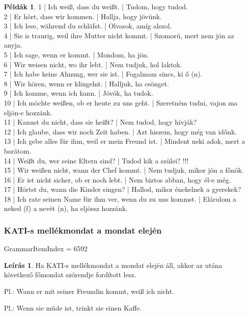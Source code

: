\documentclass{article}
\theoremstyle{definition}
\newtheorem*{exmp}{Példák}
\newtheorem*{desc}{Leírás}
\begin{document}
\begin{exmp}
1 | Ich weiß, dass du weißt. | Tudom, hogy tudod.\\
2 | Er hört, dass wir kommen. | Hallja, hogy jövünk.\\
3 | Ich lese, während du schläfst. | Olvasok, amíg alszol.\\
4 | Sie is traurig, weil ihre Mutter nicht kommt. | Szomorú, mert nem jön az anyja.\\
5 | Ich sage, wenn er kommt. | Mondom, ha jön.\\
6 | Wir weisen nicht, wo ihr lebt. | Nem tudjuk, hol laktok.\\
7 | Ich habe keine Ahnung, wer sie ist. | Fogalmam sincs, ki ő (n).\\
8 | Wir hören, wenn er klingelnt. | Halljuk, ha csönget.\\
9 | Ich komme, wenn ich kann. | Jövök, ha tudok.\\
10 | Ich möchte weißen, ob er heute zu uns geht. | Szeretném tudni, vajon ma eljön-e hozzánk.\\
11 | Kannst du nicht, dass sie heißt? | Nem tudod, hogy hívják?\\
12 | Ich glaube, dass wir noch Zeit haben. | Azt hiszem, hogy még van időnk.\\
13 | Ich gebe alles für ihm, weil er mein Freund ist. | Mindent neki adok, mert a barátom.\\
14 | Weißt du, wer seine Eltern sind? | Tudod kik a szülei? !!!\\
15 | Wir weißen nicht, wann der Chef kommt. | Nem tudjuk, mikor jön a főnök.\\
16 | Er ist nicht sicher, ob er noch lebt. | Nem biztos abban, hogy él-e még.\\
17 | Hörtst du, wann die Kinder singen? | Hallod, mikor énekelnek a gyerekek?\\
18 | Ich rate seinen Name für ihm ver, wenn du zu uns kommst. | Elárulom a neked (f) a nevét (n), ha eljössz hozzánk.\\
\end{exmp}

\subsubsection{KATI-s mellékmondat a mondat elején}

GrammarItemIndex = 6592

\begin{desc}
Ha KATI-s mellékmondat a mondat elején áll, akkor az utána következő főmondat szórendje fordított lesz.

Pl.: Wann er mit seiner Freundin kommt, weiß ich nicht.

Pl.: Wenn sie müde ist, trinkt sie einen Kaffe.
\end{desc}
\end{document}
